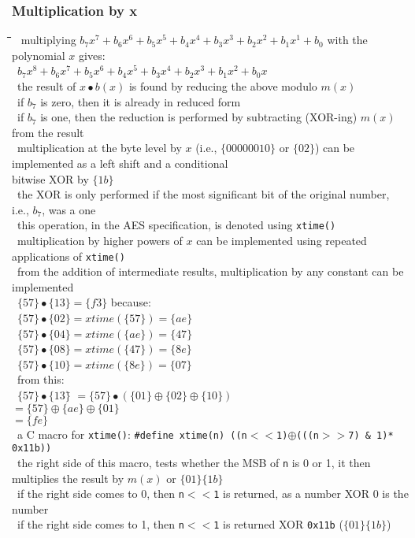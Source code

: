 \documentclass[10pt,letterpaper]{scrartcl}
\newcommand{\tbul}{\textbullet}
\newcommand{\tend}{\>\textendash}
\newcommand{\tasc}{\>\>\textasteriskcentered}
\newcommand{\tabDef}{\hspace{2em}\=\hspace{2em}\=\hspace{2em}\=\hspace{2em}\=\kill}
\begin{document}
\subsubsection*{Multiplication by x}\begin{tabbing}\tabDef 
\tbul\ multiplying $b_7x^7+b_6x^6+b_5x^5+b_4x^4+b_3x^3+b_2x^2+b_1x^1+b_0$ with the polynomial $x$ gives:  \\
\>\>\>\>\ $b_7x^8+b_6x^7+b_5x^6+b_4x^5+b_3x^4+b_2x^3+b_1x^2+b_0x$ \\
    \tend\ the result of $x\bullet b(x)$ is found by reducing the above modulo $m(x)$ \\
    \tend\ if $b_7$ is zero, then it is already in reduced form \\
    \tend\ if $b_7$ is one, then the reduction is performed by subtracting (XOR-ing) $m(x)$ from the result \\
\tbul\ multiplication at the byte level by $x$ (i.e., $\{00000010\}$ or $\{02\}$) can be implemented as a left shift and a conditional\\ bitwise XOR by $\{1b\}$\\
    \tend\ the XOR is only performed if the most significant bit of the original number, i.e., $b_7$, was a one \\
    \tend\ this operation, in the AES specification, is denoted using \texttt{xtime()} \\
    \tend\ multiplication by higher powers of $x$ can be implemented using repeated applications of \texttt{xtime()}\\
    \tend\ from the addition of intermediate results, multiplication by any constant can be implemented \\ 
\>\>\>\>\ $\{57\}\bullet \{13\}=\{f3\}$ because: \\
\>\>\>\>\ $\{57\}\bullet \{02\}=xtime(\{57\})=\{ae\}$\\
\>\>\>\>\ $\{57\}\bullet \{04\}=xtime(\{ae\})=\{47\}$\\
\>\>\>\>\ $\{57\}\bullet \{08\}=xtime(\{47\})=\{8e\}$\\
\>\>\>\>\ $\{57\}\bullet \{10\}=xtime(\{8e\})=\{07\}$ \\
    \tend\ from this: \\
\>\>\>\>\ $\{57\}\bullet \{13\}$\= $=\{57\}\bullet (\{01\}\oplus\{02\}\oplus\{10\})$ \\
\>\>\>\>\> $=\{57\}\oplus\{ae\}\oplus\{01\}$\\
\>\>\>\>\> $=\{fe\}$ \\                     
    \tend\ a C macro for \texttt{xtime()}: \texttt{\#define xtime(n) ((n$<<$1)$\oplus$(((n$>>$7) \& 1)* 0x11b))} \\
        \tasc\ the right side of this macro, tests whether the MSB of \texttt{n} is 0 or 1, it then multiplies the result by $m(x)$ or $\{01\}\{1b\}$ \\
        \tasc\ if the right side comes to 0, then \texttt{n$<<$1} is returned, as a number XOR 0 is the number \\
        \tasc\ if the right side comes to 1, then \texttt{n$<<$1} is returned XOR \texttt{0x11b} ($\{01\}\{1b\}$)\end{tabbing}
\end{document}
